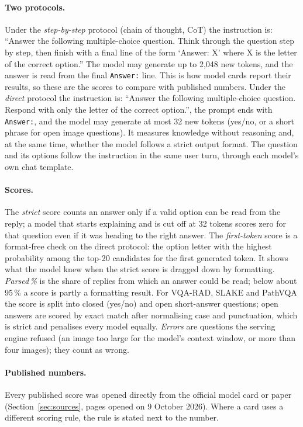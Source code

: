\documentclass{article}
\newcommand{\pct}{\,\%}
\begin{document}
\paragraph{Two protocols.} Under the \emph{step-by-step} protocol (chain of thought, CoT) the instruction is: ``Answer the following multiple-choice question. Think through the question step by step, then finish with a final line of the form `Answer: X' where X is the letter of the correct option.'' The model may generate up to 2,048 new tokens, and the answer is read from the final \texttt{Answer:} line. This is how model cards report their results, so these are the scores to compare with published numbers. Under the \emph{direct} protocol the instruction is: ``Answer the following multiple-choice question. Respond with only the letter of the correct option.'', the prompt ends with \texttt{Answer:}, and the model may generate at most 32 new tokens (yes/no, or a short phrase for open image questions). It measures knowledge without reasoning and, at the same time, whether the model follows a strict output format. The question and its options follow the instruction in the same user turn, through each model's own chat template.

\paragraph{Scores.} The \emph{strict} score counts an answer only if a valid option can be read from the reply; a model that starts explaining and is cut off at 32 tokens scores zero for that question even if it was heading to the right answer. The \emph{first-token} score is a format-free check on the direct protocol: the option letter with the highest probability among the top-20 candidates for the first generated token. It shows what the model knew when the strict score is dragged down by formatting. \emph{Parsed\pct{}} is the share of replies from which an answer could be read; below about 95\pct{} a score is partly a formatting result. For VQA-RAD, SLAKE and PathVQA the score is split into closed (yes/no) and open short-answer questions; open answers are scored by exact match after normalising case and punctuation, which is strict and penalises every model equally. \emph{Errors} are questions the serving engine refused (an image too large for the model's context window, or more than four images); they count as wrong.

\paragraph{Published numbers.} Every published score was opened directly from the official model card or paper (Section~\ref{sec:sources}, pages opened on 9 October 2026). Where a card uses a different scoring rule, the rule is stated next to the number.
\end{document}
